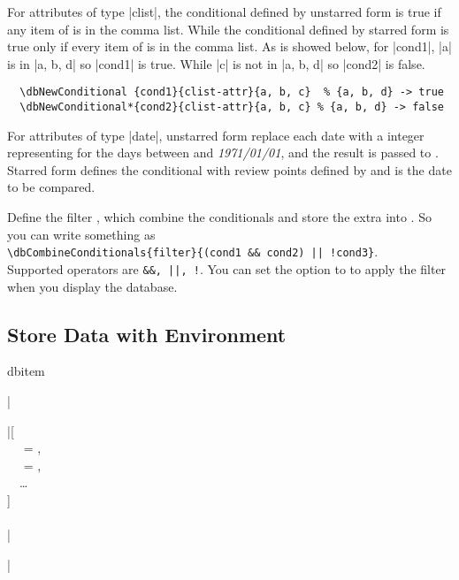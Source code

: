 \documentclass[full]{l3doc}
\begin{document}
\begin{documentation}
  For attributes of type |clist|, the conditional defined by unstarred form is
  true if any item of  is in the comma list. While the
  conditional defined by starred form is true only if every item of  is in the comma list. As is showed below, for |cond1|, |a| is in
  |{a, b, d}| so |cond1| is true. While |c| is not in |{a, b, d}| so |cond2|
  is false.

\begin{verbatim}
  \dbNewConditional {cond1}{clist-attr}{a, b, c}  % {a, b, d} -> true
  \dbNewConditional*{cond2}{clist-attr}{a, b, c} % {a, b, d} -> false
\end{verbatim}

  For attributes of type |date|, unstarred form replace each date with a
  integer representing for the days between  and
  \textit{1971/01/01}, and the result is passed to .
  Starred form defines the conditional with review points defined by
   and  is the date to be compared.

\begin{function}[added=2022-01-05]{\dbCombineConditionals}
  \begin{syntax}
       
  \end{syntax}

  Define the filter , which combine the conditionals and store the
  extra  into . So you can write something as\\
  \verb=\dbCombineConditionals{filter}{(cond1 && cond2) || !cond3}=.\\
  Supported operators are \verb=&&, ||, !=. You can set the option 
  to  to apply the filter when you display the database.
\end{function}

\subsection{Store Data with  Environment}

\begin{environment}[added=2022-01-05]{dbitem}
  \begin{syntax}
    |\begin{dbitem}|[ \\
    ~~ = , \\
    ~~ = , \\
    ~~\ldots{} \\
    ] \\
    ~~ \\
    |\end{dbitem}|
  \end{syntax}


\end{environment}
\end{documentation}
\end{document}
